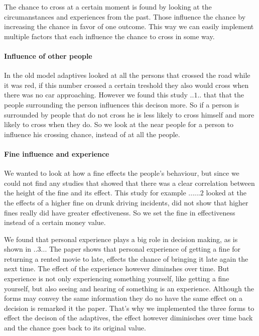 \documentclass[a4paper]{article}
\begin{document}
The chance to cross at a certain moment is found by looking at the circumanstances and experiences from the past. Those influence the chance by increasing the chance in favor of one outcome. This way we can easily implement multiple factors that each influence the chance to cross in some way. 

\paragraph{Influence of other people}
In the old model adaptives looked at all the persons that crossed the road while it was red, if this number crossed a certain treshold they also would cross when there was no car approaching. However we found this study  ..$1$.. that that the people surrounding the person influences this decison more. So if a person is surrounded by people that do not cross he is less likely to cross himself and more likely to cross when they do. So we look at the near people for a person to influence his crossing chance, instead of at all the people. 

\paragraph{Fine influence and experience}
We wanted to look at how a fine effects the people's behaviour, but since we could not find any studies that showed that there was a clear correlation between the height of the fine and its effect. This study for example ......$2$ looked at the the effects of a higher fine on drunk driving incidents, did not show that higher fines really did have greater effectiveness. So we set the fine in effectiveness instead of a certain money value. 

We found that personal experience plays a big role in decision making, as is shown in ..$3$... The paper shows that personal experience of getting a fine for returning a rented movie to late, effects the chance of bringing it late again the next time. The effect of the experience however diminshes over time. But experience is not only experiencing something yourself, like getting a fine yourself, but also seeing and hearing of something is an experience. Although the forms may convey the same information they do no have the same effect on a decision is remarked it the paper. That's why we implemented the three forms to effect the decison of the adaptives, the effect however diminisches over time back and the chance goes back to its original value.
\end{document}
